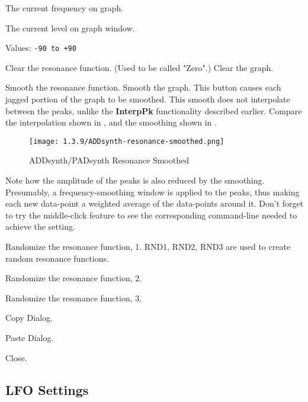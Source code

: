    The current frequency on graph.

   The current level on graph window.

   Values: \texttt{-90 to +90}

   Clear the resonance function.  (Used to be called "Zero".)
   Clear the graph.

   Smooth the resonance function.
   Smooth the graph.
   This button causes each jagged portion of the graph to be smoothed.
   This smooth does not interpolate between the peaks, unlike the 
   \textbf{InterpPk} functionality described earlier.  Compare the
   interpolation shown in ,
   and the smoothing shown in .

\begin{figure}[H]
   \centering 
   \texttt{[image: 1.3.9/ADDsynth-resonance-smoothed.png]}
   \caption{ADDsynth/PADsynth Resonance Smoothed}
   \label{fig:addsynth_resonance_smoothed}
\end{figure}

   Note how the amplitude of the peaks is also reduced by the smoothing.
   Presumably, a frequency-smoothing window is applied to the peaks, thus making
   each new data-point a weighted average of the data-points around it.
   Don't forget to try the middle-click feature to see the corresponding
   command-line needed to achieve the setting.

   Randomize the resonance function, 1.
   RND1, RND2, RND3 are used to create random resonance functions.

   Randomize the resonance function, 2.

   Randomize the resonance function, 3.

   Copy Dialog.

   Paste Dialog.

   Close.

\subsection{LFO Settings}
\label{subsec:lfo_settings}

